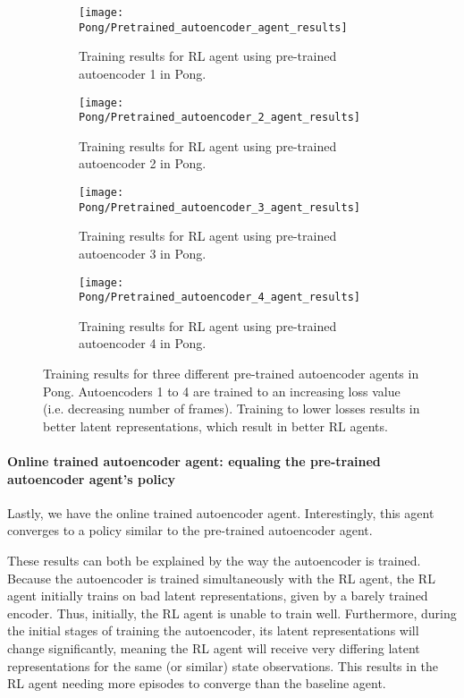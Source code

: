 \begin{figure}[h]
	\centering
	\begin{subfigure}[b]{0.49\textwidth}
		\texttt{[image: Pong/Pretrained\_autoencoder\_agent\_results]}
		\caption{Training results for RL agent using pre-trained autoencoder 1 in Pong.}
		\label{fig:ae1-results-pong}
	\end{subfigure}
	\begin{subfigure}[b]{0.49\textwidth}
		\texttt{[image: Pong/Pretrained\_autoencoder\_2\_agent\_results]}
		\caption{Training results for RL agent using pre-trained autoencoder 2 in Pong.}
		\label{fig:ae2-results-pong}
	\medskip
	\end{subfigure}
	\begin{subfigure}[b]{0.49\textwidth}
		\texttt{[image: Pong/Pretrained\_autoencoder\_3\_agent\_results]}
		\caption{Training results for RL agent using pre-trained autoencoder 3 in Pong.}
		\label{fig:ae3-results-pong}
	\end{subfigure}
	\begin{subfigure}[b]{0.49\textwidth}
		\texttt{[image: Pong/Pretrained\_autoencoder\_4\_agent\_results]}
		\caption{Training results for RL agent using pre-trained autoencoder 4 in Pong.}
		\label{fig:ae4-results-pong}
	\end{subfigure}
	\caption{Training results for three different pre-trained autoencoder agents in Pong. Autoencoders 1 to 4 are trained to an increasing loss value (i.e. decreasing number of frames). Training to lower losses results in better latent representations, which result in better RL agents.}
	\label{fig:ae-results-pong}
\end{figure}

\clearpage
\paragraph{Online trained autoencoder agent: equaling the pre-trained autoencoder agent's policy}
Lastly, we have the online trained autoencoder agent. Interestingly, this agent converges to a policy similar to the pre-trained autoencoder agent.

These results can both be explained by the way the autoencoder is trained. Because the autoencoder is trained simultaneously with the RL agent, the RL agent initially trains on bad latent representations, given by a barely trained encoder. Thus, initially, the RL agent is unable to train well. Furthermore, during the initial stages of training the autoencoder, its latent representations will change significantly, meaning the RL agent will receive very differing latent representations for the same (or similar) state observations. This results in the RL agent needing more episodes to converge than the baseline agent.

